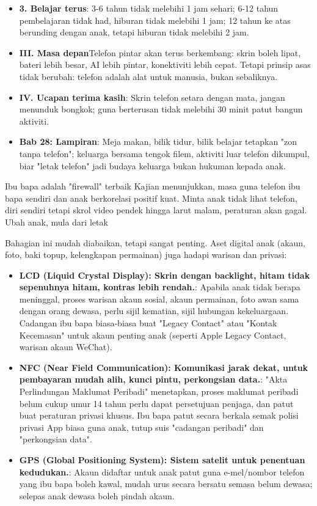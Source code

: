 \begin{itemize}
  \item \textbf{3. Belajar terus}: 3-6 tahun tidak melebihi 1 jam sehari; 6-12 tahun pembelajaran tidak had, hiburan tidak melebihi 1 jam; 12 tahun ke atas berunding dengan anak, tetapi hiburan tidak melebihi 2 jam.
  \item \textbf{III. Masa depan}Telefon pintar akan terus berkembang: skrin boleh lipat, bateri lebih besar, AI lebih pintar, konektiviti lebih cepat. Tetapi prinsip asas tidak berubah: telefon adalah alat untuk manusia, bukan sebaliknya.
  \item \textbf{IV. Ucapan terima kasih}: Skrin telefon setara dengan mata, jangan menunduk bongkok; guna berterusan tidak melebihi 30 minit patut bangun aktiviti.
  \item \textbf{Bab 28: Lampiran}: Meja makan, bilik tidur, bilik belajar tetapkan "zon tanpa telefon"; keluarga bersama tengok filem, aktiviti luar telefon dikumpul, biar "letak telefon" jadi budaya keluarga bukan hukuman kepada anak.
\end{itemize}

\begin{tcbinfo}{Ibu bapa adalah "firewall" terbaik}
Kajian menunjukkan, masa guna telefon ibu bapa sendiri dan anak berkorelasi positif kuat. Minta anak tidak lihat telefon, diri sendiri tetapi skrol video pendek hingga larut malam, peraturan akan gagal. Ubah anak, mula dari letak

\end{tcbinfo}


Bahagian ini mudah diabaikan, tetapi sangat penting. Aset digital anak (akaun, foto, baki topup, kelengkapan permainan) juga hadapi warisan dan privasi:

\begin{itemize}
  \item \textbf{LCD (Liquid Crystal Display): Skrin dengan backlight, hitam tidak sepenuhnya hitam, kontras lebih rendah.}: Apabila anak tidak berapa meninggal, proses warisan akaun sosial, akaun permainan, foto awan sama dengan orang dewasa, perlu sijil kematian, sijil hubungan kekeluargaan. Cadangan ibu bapa biasa-biasa buat "Legacy Contact" atau "Kontak Kecemasan" untuk akaun penting anak (seperti Apple Legacy Contact, warisan akaun WeChat).
  \item \textbf{NFC (Near Field Communication): Komunikasi jarak dekat, untuk pembayaran mudah alih, kunci pintu, perkongsian data.}: "Akta Perlindungan Maklumat Peribadi" menetapkan, proses maklumat peribadi belum cukup umur 14 tahun perlu dapat persetujuan penjaga, dan patut buat peraturan privasi khusus. Ibu bapa patut secara berkala semak polisi privasi App biasa guna anak, tutup suis "cadangan peribadi" dan "perkongsian data".
  \item \textbf{GPS (Global Positioning System): Sistem satelit untuk penentuan kedudukan.}: Akaun didaftar untuk anak patut guna e-mel/nombor telefon yang ibu bapa boleh kawal, mudah urus secara bersatu semasa belum dewasa; selepas anak dewasa boleh pindah akaun.
\end{itemize}

